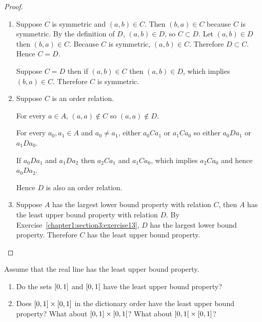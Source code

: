 \begin{proof}
    \begin{enumerate}[label={(\alph*)}]
        \item Suppose $C$ is symmetric and $(a, b)\in C$. Then $(b, a)\in C$ because $C$ is symmetric. By the definition of $D$, $(a, b)\in D$, so $C\subset D$. Let $(a, b)\in D$ then $(b, a)\in C$. Because $C$ is symmetric, $(a, b)\in C$. Therefore $D\subset C$. Hence $C = D$.

              Suppose $C = D$ then if $(a, b)\in C$ then $(a, b)\in D$, which implies $(b, a)\in C$. Therefore $C$ is symmetric.
        \item Suppose $C$ is an order relation.

              For every $a\in A$, $(a, a)\notin C$ so $(a, a)\notin D$.

              For every $a_{0}, a_{1}\in A$ and $a_{0}\ne a_{1}$, either $a_{0}Ca_{1}$ or $a_{1}Ca_{0}$ so either $a_{0}Da_{1}$ or $a_{1}Da_{0}$.

              If $a_{0}Da_{1}$ and $a_{1}Da_{2}$ then $a_{2}Ca_{1}$ and $a_{1}Ca_{0}$, which implies $a_{2}Ca_{0}$ and hence $a_{0}Da_{2}$.

              Hence $D$ is also an order relation.
        \item Suppose $A$ has the largest lower bound property with relation $C$, then $A$ has the least upper bound property with relation $D$. By Exercise~\ref{chapter1:section3:exercise13}, $D$ has the largest lower bound property. Therefore $C$ has the least upper bound property.
    \end{enumerate}
\end{proof}

\begin{exercise}\label{chapter1:section3:exercise15}
    Assume that the real line has the least upper bound property.
    \begin{enumerate}[label={(\alph*)}]
        \item Do the sets $\left[{0, 1}\right]$ and $\left[{0, 1}\right[$ have the least upper bound property?
        \item Does $\left[{0,1}\right]\times\left[{0,1}\right]$ in the dictionary order have the least upper bound property? What about $\left[{0,1}\right]\times\left[{0,1}\right[$? What about $\left[{0,1}\right[\times\left[{0,1}\right]$?
    \end{enumerate}
\end{exercise}


